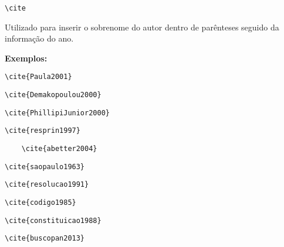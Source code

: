 \begin{alineas}
\item
\begin{verbatim}
\cite
\end{verbatim}

Utilizado para inserir o sobrenome do autor dentro de parênteses seguido da informação do ano.

\textbf{Exemplos:} 

\begin{verbatim}
\cite{Paula2001}
\end{verbatim}
\cite{Paula2001}

\begin{verbatim}
\cite{Demakopoulou2000}
\end{verbatim}
\cite{Demakopoulou2000}

\begin{verbatim}
\cite{PhillipiJunior2000}
\end{verbatim}
\cite{PhillipiJunior2000}

\begin{verbatim}
\cite{resprin1997}
\end{verbatim}
\cite{resprin1997}

\begin{verbatim}
	\cite{abetter2004}
\end{verbatim}
\cite{abetter2004}

\begin{verbatim}
\cite{saopaulo1963}
\end{verbatim}
\cite{saopaulo1963}

\begin{verbatim}
\cite{resolucao1991}
\end{verbatim}
\cite{resolucao1991}

\begin{verbatim}
\cite{codigo1985}
\end{verbatim}
\cite{codigo1985}

\begin{verbatim}
\cite{constituicao1988}
\end{verbatim}
\cite{constituicao1988}
\begin{verbatim}
\cite{buscopan2013}
\end{verbatim}
\cite{buscopan2013}


\end{alineas}

